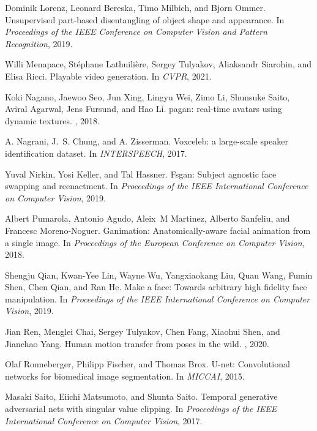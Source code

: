 \documentclass[final]{cvpr}
\begin{document}
\begin{thebibliography}{10}
Dominik Lorenz, Leonard Bereska, Timo Milbich, and Bjorn Ommer.
\newblock Unsupervised part-based disentangling of object shape and appearance.
\newblock In {\em Proceedings of the IEEE Conference on Computer Vision and
  Pattern Recognition}, 2019.

Willi Menapace, Stéphane Lathuilière, Sergey Tulyakov, Aliaksandr Siarohin,
  and Elisa Ricci.
\newblock Playable video generation.
\newblock In {\em CVPR}, 2021.

Koki Nagano, Jaewoo Seo, Jun Xing, Lingyu Wei, Zimo Li, Shunsuke Saito, Aviral
  Agarwal, Jens Fursund, and Hao Li.
\newblock pagan: real-time avatars using dynamic textures.
, 2018.

A. Nagrani, J.~S. Chung, and A. Zisserman.
\newblock Voxceleb: a large-scale speaker identification dataset.
\newblock In {\em INTERSPEECH}, 2017.

Yuval Nirkin, Yosi Keller, and Tal Hassner.
\newblock Fsgan: Subject agnostic face swapping and reenactment.
\newblock In {\em Proceedings of the IEEE International Conference on Computer
  Vision}, 2019.

Albert Pumarola, Antonio Agudo, Aleix~M Martinez, Alberto Sanfeliu, and
  Francesc Moreno-Noguer.
\newblock Ganimation: Anatomically-aware facial animation from a single image.
\newblock In {\em Proceedings of the European Conference on Computer Vision},
  2018.

Shengju Qian, Kwan-Yee Lin, Wayne Wu, Yangxiaokang Liu, Quan Wang, Fumin Shen,
  Chen Qian, and Ran He.
\newblock Make a face: Towards arbitrary high fidelity face manipulation.
\newblock In {\em Proceedings of the IEEE International Conference on Computer
  Vision}, 2019.

Jian Ren, Menglei Chai, Sergey Tulyakov, Chen Fang, Xiaohui Shen, and Jianchao
  Yang.
\newblock Human motion transfer from poses in the wild.
, 2020.

Olaf Ronneberger, Philipp Fischer, and Thomas Brox.
\newblock U-net: Convolutional networks for biomedical image segmentation.
\newblock In {\em MICCAI}, 2015.

Masaki Saito, Eiichi Matsumoto, and Shunta Saito.
\newblock Temporal generative adversarial nets with singular value clipping.
\newblock In {\em Proceedings of the IEEE International Conference on Computer
  Vision}, 2017.


\end{thebibliography}
\end{document}
